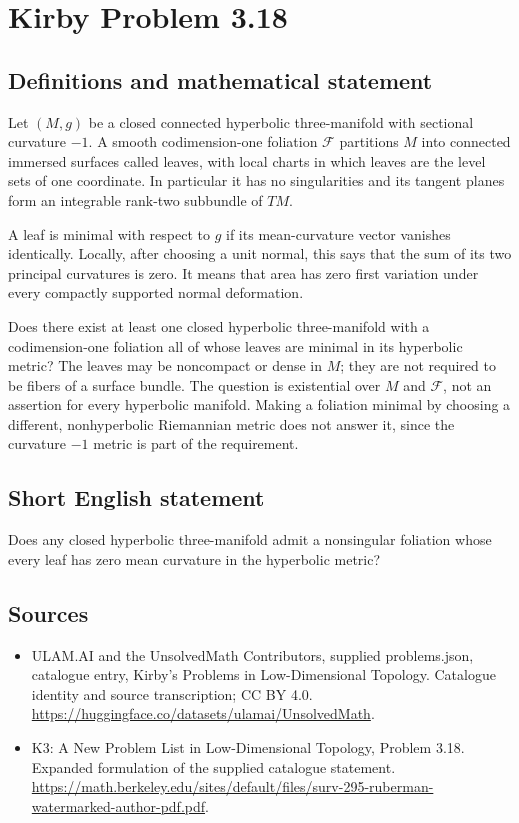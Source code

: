 \documentclass[11pt,a4paper]{article}
\begin{document}
\section*{Kirby Problem 3.18}\label{statement}

\subsection{Definitions and mathematical statement}
Let $(M,g)$ be a closed connected hyperbolic three-manifold with sectional
curvature $-1$. A smooth codimension-one foliation $\mathcal F$ partitions
$M$ into connected immersed surfaces called leaves, with local charts in
which leaves are the level sets of one coordinate. In particular it has no
singularities and its tangent planes form an integrable rank-two subbundle
of $TM$.

A leaf is minimal with respect to $g$ if its mean-curvature vector vanishes
identically. Locally, after choosing a unit normal, this says that the sum
of its two principal curvatures is zero. It means that area has zero first
variation under every compactly supported normal deformation.

Does there exist at least one closed hyperbolic three-manifold with a
codimension-one foliation all of whose leaves are minimal in its hyperbolic
metric? The leaves may be noncompact or dense in $M$; they are not required
to be fibers of a surface bundle. The question is existential over $M$ and
$\mathcal F$, not an assertion for every hyperbolic manifold. Making a
foliation minimal by choosing a different, nonhyperbolic Riemannian metric
does not answer it, since the curvature $-1$ metric is part of the requirement.
\subsection{Short English statement}
Does any closed hyperbolic three-manifold admit a nonsingular foliation whose every leaf has zero mean curvature in the hyperbolic metric?
\subsection{Sources}
\begin{itemize}
\item[S1] ULAM.AI and the UnsolvedMath Contributors, supplied problems.json, catalogue entry, Kirby's Problems in Low-Dimensional Topology. Catalogue identity and source transcription; CC BY 4.0.
\url{https://huggingface.co/datasets/ulamai/UnsolvedMath}.
\item[S2] K3: A New Problem List in Low-Dimensional Topology, Problem 3.18. Expanded formulation of the supplied catalogue statement.
\url{https://math.berkeley.edu/sites/default/files/surv-295-ruberman-watermarked-author-pdf.pdf}.
\end{itemize}
\end{document}
